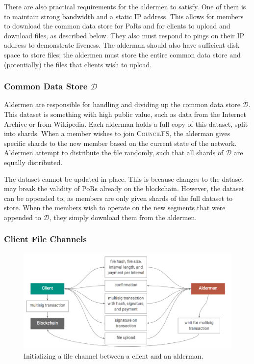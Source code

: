 \documentclass{article}
\begin{document}
There are also practical requirements for the aldermen to satisfy. One of them
is to maintain strong bandwidth and a static IP address. This allows for members
to download the common data store for PoRs and for clients to upload and
download files, as described below. They also must respond to pings on their IP
address to demonstrate liveness. The alderman should also have sufficient disk
space to store files; the aldermen must store the entire common data store and
(potentially) the files that clients wish to upload.

\subsubsection{Common Data Store $\mathcal{D}$}

Aldermen are responsible for handling and dividing up the common data store
$\mathcal{D}$. This dataset is something with high public value, such as data
from the Internet Archive or from Wikipedia. Each alderman holds a full copy of
this dataset, split into shards. When a member wishes to join
\textsc{CouncilFS}, the alderman gives specific shards to the new member based
on the current state of the network. Aldermen attempt to distribute the file
randomly, such that all shards of $\mathcal{D}$ are equally distributed.

The dataset cannot be updated in place. This is because changes to the dataset
may break the validity of PoRs already on the blockchain. However, the dataset
can be appended to, as members are only given shards of the full dataset to
store. When the members wish to operate on the new segments that were appended
to $\mathcal{D}$, they simply download them from the aldermen.

\subsubsection{Client File Channels}

\begin{figure}[t]
  \includegraphics[width=\linewidth]{figures/init_channel.png}
  \caption{Initializing a file channel between a client and an alderman.}
  \label{fig:channel}
\end{figure}
\end{document}
